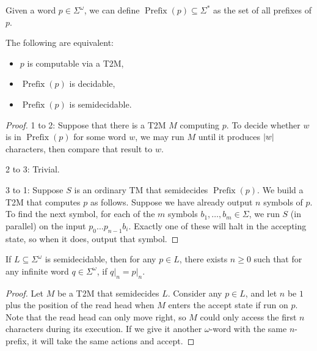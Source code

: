 
Given a word $p \in \Sigma^\omega$, we can define $\operatorname{Prefix}(p)
\subseteq \Sigma^*$ as the set of all prefixes of $p$.

\begin{theorem}
  The following are equivalent:
  \begin{itemize}
  \item $p$ is computable via a T2M,
  \item $\operatorname{Prefix}(p)$ is decidable,
  \item $\operatorname{Prefix}(p)$ is semidecidable.
  \end{itemize}
\end{theorem}

\begin{proof}
  1 to 2:
  Suppose that there is a T2M $M$ computing $p$.
  To decide whether $w$ is in $\operatorname{Prefix}(p)$ for some word $w$, we
  may run $M$ until it produces $\left| w \right|$ characters, then compare that result
  to $w$.

  2 to 3:
  Trivial.

  3 to 1:
  Suppose $S$ is an ordinary TM that semidecides $\operatorname{Prefix}(p)$.
  We build a T2M that computes $p$ as follows.
  Suppose we have already output $n$ symbols of $p$.
  To find the next symbol, for each of the $m$ symbols $b_1, \ldots, b_m \in
  \Sigma$, we run $S$ (in parallel) on the input $p_0 \ldots p_{n-1} b_i$.
  Exactly one of these will halt in the accepting state, so when it does, output
  that symbol.
\end{proof}


\begin{theorem}%
  \label{thm:tizr:topology-1}
  If $L \subseteq \Sigma^\omega$ is semidecidable, then for any $p \in L$, there
  exists $n \ge 0$ such that for any infinite word $q \in \Sigma^\omega$, if
  $\left. q \right|_n = \left. p \right|_n$.
\end{theorem}

\begin{proof}
  Let $M$ be a T2M that semidecides $L$.
  Consider any $p \in L$, and let $n$ be $1$ plus the position of the read head
  when $M$ enters the accept state if run on $p$.
  Note that the read head can only move right, so $M$ could only access the
  first $n$ characters during its execution.
  If we give it another $\omega$-word with the same $n$-prefix, it will take the
  same actions and accept.
\end{proof}

